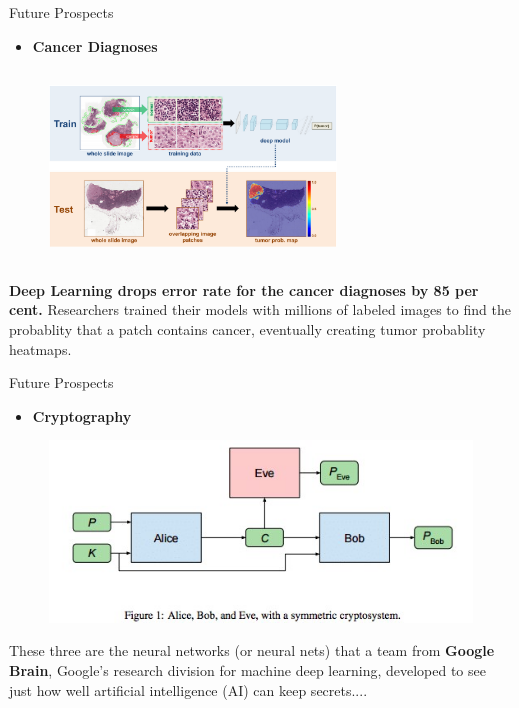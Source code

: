 \documentclass[10pt]{beamer}
\begin{document}
	\begin{frame}[c]{Future Prospects}
		\begin{itemize}
			\item \large{\textbf{Cancer Diagnoses}}
		\end{itemize}
		\begin{figure}
			\includegraphics[width=3in, height=2in]{images/cancer}
		\end{figure}
		\textbf{Deep Learning drops error rate for the cancer diagnoses by 85 per cent.}
		Researchers trained their models with millions of labeled images to find the probablity that a patch contains cancer, eventually creating tumor probablity heatmaps.
	\end{frame}
	\begin{frame}[c]{Future Prospects}
		\begin{itemize}
			\item \large{\textbf{Cryptography}}
		\end{itemize}
		\begin{figure}
			\includegraphics[width=\linewidth]{images/crypt}
		\end{figure}
		These three are the neural networks (or neural nets) that a team from \textbf{Google Brain}, Google’s research division for machine deep learning, developed to see just how well artificial intelligence (AI) can keep secrets....
	\end{frame}
\end{document}
